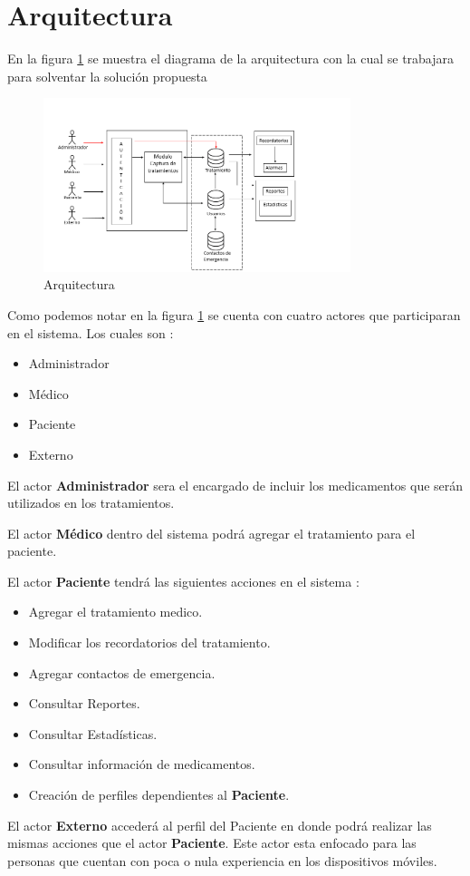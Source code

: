 \section{Arquitectura}

En la figura \ref{fig:arquitectura} se muestra el diagrama de la arquitectura con la cual se trabajara para solventar la solución propuesta


\begin{figure}[htb]
	\centering
	\includegraphics[width=0.8\textwidth]{images/cap2/Arquitectura}
	\caption{Arquitectura} \label{fig:arquitectura}
\end{figure}

Como podemos notar en la figura \ref{fig:arquitectura} se cuenta con cuatro actores que participaran en el sistema. Los cuales son :
\begin{itemize}
	\item Administrador
	\item Médico
	\item Paciente
	\item Externo
\end{itemize}

El actor \textbf{Administrador} sera el encargado de incluir los medicamentos que serán utilizados en los tratamientos.

El actor \textbf{Médico} dentro del sistema podrá agregar el tratamiento para el paciente.

El actor \textbf{Paciente} tendrá las siguientes acciones en el sistema :
\begin{itemize}
	\item Agregar el tratamiento medico.
	\item Modificar los recordatorios del tratamiento.
	\item Agregar contactos de emergencia.
	\item Consultar Reportes.
	\item Consultar Estadísticas.
	\item Consultar información de medicamentos.
	\item Creación de perfiles dependientes al \textbf{Paciente}.
\end{itemize}

El actor \textbf{Externo} accederá al perfil del Paciente en donde podrá realizar las mismas acciones que el actor \textbf{Paciente}.
Este actor esta enfocado para las personas que cuentan con poca o nula experiencia en los dispositivos móviles.